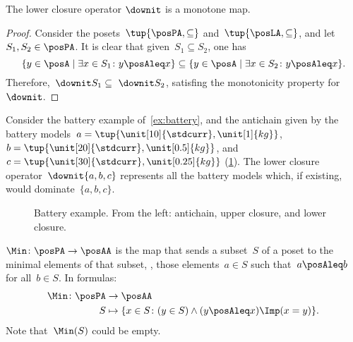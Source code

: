 \begin{lemma}
  The lower closure operator $\downit$ is a monotone map.
\end{lemma}

\begin{proof}
  Consider the posets~$\tup{\posPA,\subseteq}$ and~$\tup{\posLA,\subseteq}$, and let~$S_1,S_2\in \posPA$. It is clear that given~$S_1\subseteq S_2$, one has
  \begin{equation}
    \{y\in \posA\mid \exists x\in S_1\colon y\posAleq x\} \subseteq \{y\in \posA\mid \exists x\in S_2\colon y\posAleq x\}.
  \end{equation}
  Therefore,~$\downit S_1\subseteq \ \downit S_2$, satisfing the monotonicity property for~$\downit$.
\end{proof}



\begin{example}
  Consider the battery example of~\cref{ex:battery}, and the antichain given by the battery models~$a=\tup{\unit[10]{\stdcurr},\unit[1]{kg}}$,~$b=\tup{\unit[20]{\stdcurr},\unit[0.5]{kg}}$, and~$c=\tup{\unit[30]{\stdcurr},\unit[0.25]{kg}}$ (\cref{fig:examplebatt}).
  The lower closure operator~$\downit\{a,b,c\}$ represents all the battery models which, if existing, would dominate~$\{a,b,c\}$.

\end{example}
\begin{figure}[h!]
  \begin{center}
  \end{center}
  \caption{Battery example. From the left: antichain, upper closure, and lower closure.
  }
  \label{fig:examplebatt}
\end{figure}


\begin{definition}[Min]
  \label{def:Min}
  $\Min \colon \posPA \to \posAA$ is the map that sends a subset~$S$ of a poset to the minimal elements of that subset, \ie , those elements~$a \in S$ such that~$a \posAleq b$ for all~$b \in S$.
  In formulas:
  \begin{equation*}
    \begin{aligned}
      \Min \colon \posPA &\to \posAA\\
      S&\mapsto \{ x\in S\colon (y\in S)\wedge(y\posAleq x)\Imp (x=y)\}.
    \end{aligned}
  \end{equation*}
  Note that~$\Min(S)$ could be empty.
\end{definition}

